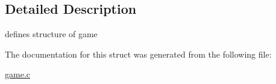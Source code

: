 \subsection{Detailed Description}
defines structure of game 

The documentation for this struct was generated from the following file\+:\begin{DoxyCompactItemize}
\item 
\hyperlink{game_8c}{game.\+c}\end{DoxyCompactItemize}
